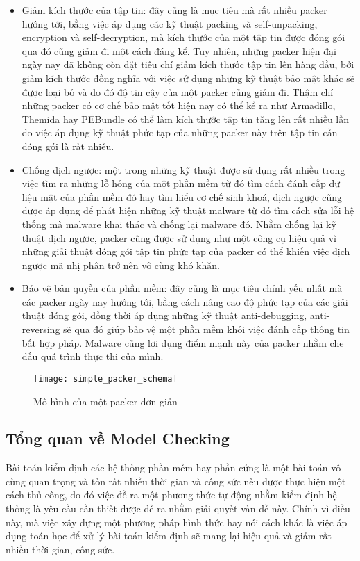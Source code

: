 \begin{itemize}
\item{Giảm kích thước của tập tin: đây cũng là mục tiêu mà rất nhiều packer hướng tới, bằng việc áp dụng các kỹ thuật packing và self-unpacking, encryption và self-decryption, mà kích thước của một tập tin được đóng gói qua đó cũng giảm đi một cách đáng kể. Tuy nhiên, những packer hiện đại ngày nay đã không còn đặt tiêu chí giảm kích thước tập tin lên hàng đầu, bởi giảm kích thước đồng nghĩa với việc sử dụng những kỹ thuật bảo mật khác sẽ được loại bỏ và do đó độ tin cậy của một packer cũng giảm đi. Thậm chí những packer có cơ chế bảo mật tốt hiện nay có thể kể ra như Armadillo, Themida hay PEBundle có thể làm kích thước tập tin tăng lên rất nhiều lần do việc áp dụng kỹ thuật phức tạp của những packer này trên tập tin cần đóng gói là rất nhiều.\\}
\item{Chống dịch ngược: một trong những kỹ thuật được sử dụng rất nhiều trong việc tìm ra những lỗ hỏng của một phần mềm từ đó tìm cách đánh cắp dữ liệu mật của phần mềm đó hay tìm hiểu cơ chế sinh khoá, dịch ngược cũng được áp dụng để phát hiện những kỹ thuật malware từ đó tìm cách sửa lỗi hệ thống mà malware khai thác và chống lại malware đó. Nhằm chống lại kỹ thuật dịch ngược, packer cũng được sử dụng như một công cụ hiệu quả vì những giải thuật đóng gói tập tin phức tạp của packer có thể khiến việc dịch ngược mã nhị phân trở nên vô cùng khó khăn.\\}
\item{Bảo vệ bản quyền của phần mềm: đây cũng là mục tiêu chính yếu nhất mà các packer ngày nay hướng tới, bằng cách nâng cao độ phức tạp của các giải thuật đóng gói, đồng thời áp dụng những kỹ thuật anti-debugging, anti-reversing sẽ qua đó giúp bảo vệ một phần mềm khỏi việc đánh cắp thông tin bất hợp pháp. Malware cũng lợi dụng điểm mạnh này của packer nhằm che dấu quá trình thực thi của mình.}
\end{itemize}

\begin{figure}[h]
\centering
\texttt{[image: simple\_packer\_schema]}
\caption{Mô hình của một packer đơn giản}
\end{figure}

\subsection{Tổng quan về Model Checking}

\hspace{0.5cm}Bài toán kiểm định các hệ thống phần mềm hay phần cứng là một bài toán vô cùng quan trọng và tốn rất nhiều thời gian và công sức nếu được thực hiện một cách thủ công, do đó việc đề ra một phương thức tự động nhằm kiểm định hệ thống là yêu cầu cần thiết được đề ra nhằm giải quyết vấn đề này. Chính vì điều này, mà việc xây dựng một phương pháp hình thức hay nói cách khác là việc áp dụng toán học để xử lý bài toán kiểm định sẽ mang lại hiệu quả và giảm rất nhiều thời gian, công sức.\\

